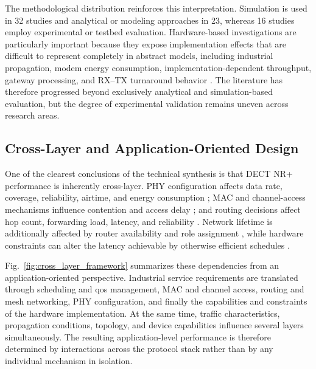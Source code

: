 The methodological distribution reinforces this interpretation. Simulation is
used in 32 studies and analytical or modeling approaches in 23, whereas 16
studies employ experimental or testbed evaluation. Hardware-based
investigations are particularly important because they expose implementation
effects that are difficult to represent completely in abstract models,
including industrial propagation, modem energy consumption,
implementation-dependent throughput, gateway processing, and RX--TX turnaround
behavior
\cite{wassmannPerformanceDECT2020NR2024,
bandaraExperimentalValidationAnalysis2025,
grafWhatExpectWhen2026,
piresDECT2020NREnergy2026b,
alizaiMeasurementDrivenLatencyAnalysis2026}.
The literature has therefore progressed beyond exclusively analytical and
simulation-based evaluation, but the degree of experimental validation remains
uneven across research areas.


\subsection{Cross-Layer and Application-Oriented Design}
\label{subsec:cross_layer_gaps}

One of the clearest conclusions of the technical synthesis is that DECT NR+
performance is inherently cross-layer. PHY configuration affects data rate,
coverage, reliability, airtime, and energy consumption
\cite{grafParetoOptimalityApproach2026a}; MAC and channel-access mechanisms
influence contention and access delay
\cite{samuylovPerformanceMACLayer2024a,
gaidamakaOptimizingDelaysRandom2025}; and routing decisions affect hop count,
forwarding load, latency, and reliability
\cite{asifURLLCBasedMultiHopCommunication2025,
alamDLRoutingPerformance2026a,
rauwolfTopologyAwareDeepReinforcement2026a}. Network lifetime is additionally
affected by router availability and role assignment
\cite{nihtilaEnergyConsumptionDECT20202022,
nihtilaEnergySavingRouter2022}, while hardware constraints can alter the
latency achievable by otherwise efficient schedules
\cite{alizaiMeasurementDrivenLatencyAnalysis2026}.

Fig.~\ref{fig:cross_layer_framework} summarizes these dependencies from an
application-oriented perspective. Industrial service requirements are
translated through scheduling and \gls{qos} management, MAC and channel
access, routing and mesh networking, PHY configuration, and finally the
capabilities and constraints of the hardware implementation. At the same
time, traffic characteristics, propagation conditions, topology, and device
capabilities influence several layers simultaneously. The resulting
application-level performance is therefore determined by interactions across
the protocol stack rather than by any individual mechanism in isolation.

